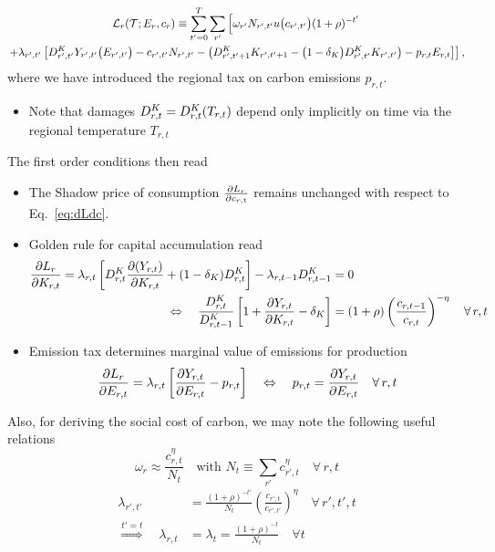 \documentclass[preprint,3p,authoryear]{elsarticle}
\begin{document}
\begin{multline}
  \label{eq:LKAreg} \mathcal{L}_r(\mathcal{T};E_r,c_r)\equiv\sum_{t'=0}^{T}\sum_{r'}\left[\omega_{r'}N_{r',t'}u\big(c_{r',t'}\big)(1+\rho)^{-t'}\right.\\
  \left.+\lambda_{r',t'}\left[D^K_{r',t'}Y_{r',t'}\big(E_{r',t'}\big) -c_{r',t'}N_{r',t'}-\left(D^K_{r',t'+1}K_{r',t'+1}-\big(1-\delta_K\big)D^K_{r',t'}K_{r',t'}\right)-p_{r,t}E_{r,t} \right]\right],
\end{multline}
where we have introduced the regional tax on carbon emissions $p_{r,t}$.
\begin{itemize}
\item Note that damages $D^K_{r,t}=D^K_{r,t}(T_{r,t})$ depend only implicitly on time via the regional temperature $T_{r,t}$
\end{itemize}
The first order conditions then read
\begin{itemize}
\item The Shadow price of consumption $\frac{\partial L_r}{\partial c_{r,t}}$ remains unchanged with respect to Eq.~\eqref{eq:dLdc}.

\item Golden rule for capital accumulation read
  \begin{align} \frac{\partial L_r}{\partial K_{r,t}}=\lambda_{r,t}\left[D^K_{r,t}\frac{\partial(Y_{r,t})}{\partial K_{r,t}}+(1-\delta_K)D^K_{r,t}\right]-\lambda_{r,t-1}D^K_{r,t-1}&= 0\notag\\
    \Leftrightarrow\quad \frac{D^K_{r,t}}{D^K_{r,t-1}}\left[1+\frac{\partial Y_{r,t}}{\partial K_{r,t}}-\delta_K\right] &= (1+\rho)\left(\frac{c_{r,t-1}}{c_{r,t}}\right)^{-\eta}\quad\forall\, r,t \label{eq:dLdK}
  \end{align}
\item Emission tax determines marginal value of emissions for production  
  \begin{equation}
    \label{eq:dLdE} \frac{\partial L_r}{\partial E_{r,t}}=\lambda_{r,t}\left[\frac{\partial Y_{r,t}}{\partial E_{r,t}}-p_{r,t}\right]\quad\Leftrightarrow\quad p_{r,t}=\frac{\partial Y_{r,t}}{\partial E_{r,t}} \quad\forall\,r,t 
  \end{equation}
\end{itemize}

Also, for deriving the social cost of carbon, we may note the following useful relations 
\begin{equation}
  \label{eq:Negishi}
  \omega_{r}\approx \frac{c_{r,t}^{\eta}}{N_{t}}\quad\text{with }N_t\equiv\sum_{r'}c_{r',t}^{\eta} \quad\forall\,r,t
\end{equation}
\begin{subequations}
  \label{eq:lambda}
\begin{align} \lambda_{r',t'}&=\frac{(1+\rho)^{-t'}}{N_t}\left(\frac{c_{r',t}}{c_{r',t'}}\right)^{\eta}\quad\forall\, r',t',t\label{subeq:delta_rptp}\\
  \overset{t'=t}{\Rightarrow}\quad
  \lambda_{r,t}&=\lambda_{t}=\frac{(1+\rho)^{-t}}{N_t}\quad \forall t\label{subeq:delta_rt}
\end{align}
\end{subequations}
\end{document}
